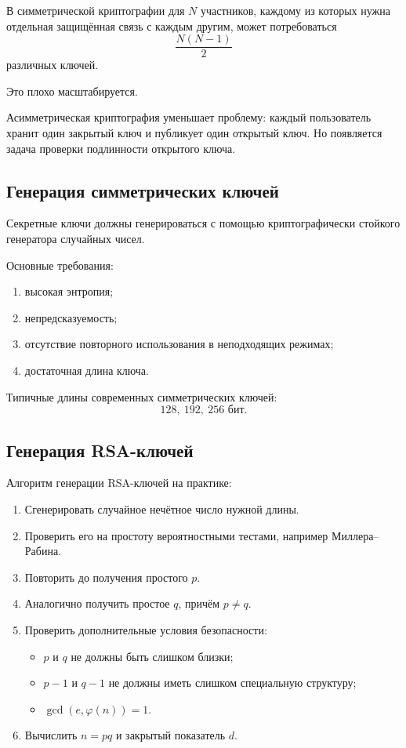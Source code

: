 \documentclass[12pt,a4paper]{article}
\begin{document}
В симметрической криптографии для $N$ участников, каждому из которых нужна отдельная защищённая связь с каждым другим, может потребоваться
\[
    \frac{N(N-1)}{2}
\]
различных ключей.

Это плохо масштабируется.

Асимметрическая криптография уменьшает проблему: каждый пользователь хранит один закрытый ключ и публикует один открытый ключ. Но появляется задача проверки подлинности открытого ключа.

\subsection{Генерация симметрических ключей}

Секретные ключи должны генерироваться с помощью криптографически стойкого генератора случайных чисел.

Основные требования:

\begin{enumerate}
    \item высокая энтропия;
    \item непредсказуемость;
    \item отсутствие повторного использования в неподходящих режимах;
    \item достаточная длина ключа.
\end{enumerate}

Типичные длины современных симметрических ключей:
\[
    128,\ 192,\ 256 \text{ бит}.
\]

\subsection{Генерация RSA-ключей}

Алгоритм генерации RSA-ключей на практике:

\begin{enumerate}
    \item Сгенерировать случайное нечётное число нужной длины.
    \item Проверить его на простоту вероятностными тестами, например Миллера--Рабина.
    \item Повторить до получения простого $p$.
    \item Аналогично получить простое $q$, причём $p\ne q$.
    \item Проверить дополнительные условия безопасности:
    \begin{itemize}
        \item $p$ и $q$ не должны быть слишком близки;
        \item $p-1$ и $q-1$ не должны иметь слишком специальную структуру;
        \item $\gcd(e,\varphi(n))=1$.
    \end{itemize}
    \item Вычислить $n=pq$ и закрытый показатель $d$.
\end{enumerate}
\end{document}
